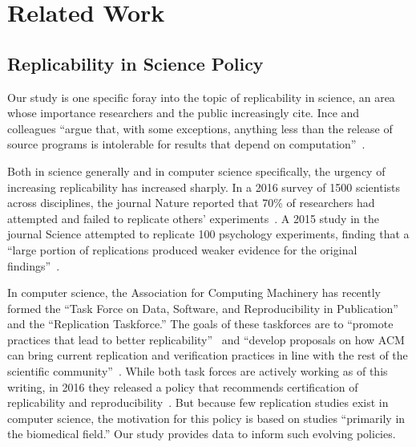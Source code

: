 \documentclass[10pt,conference]{IEEEtran}
\begin{document}
\section{Related Work}


\subsection{Replicability in Science Policy}


Our study is one specific foray into the topic of replicability
in science, an area whose importance researchers and the public 
increasingly cite.
Ince and colleagues ``argue that, with some exceptions, anything less 
than the release of source programs is intolerable for 
results that depend on computation''~\cite{ince2012case}.

Both in science generally and in computer science specifically,
the urgency of increasing replicability has increased sharply.
In a 2016 survey of 1500 scientists across disciplines, the journal
Nature reported that 70\% of researchers had attempted
and failed to replicate others' experiments~\cite{baker20161}.
A 2015 study in the journal Science 
attempted to replicate 100 psychology experiments,
finding that a ``large portion of replications produced weaker evidence for the original findings''~\cite{open2015estimating}.

In computer science, the Association for Computing Machinery has
recently formed the ``Task Force on Data, Software, and Reproducibility in Publication''
and the ``Replication Taskforce.''
The goals of these taskforces are to 
``promote practices that lead to better replicability''~\cite{acmDataTaskforce} and 
``develop proposals on how ACM can bring current replication and 
verification practices in line with the rest of the scientific 
community''~\cite{acmRepTaskforce}.
While both task forces are actively working as of this writing, 
in 2016 they released a policy that recommends certification of
replicability and reproducibility~\cite{acmArtifactPolicy}.
But because few replication studies exist in computer science,
the motivation for this policy is based on studies
``primarily in the biomedical field.''
Our study provides data to inform such evolving policies.
\end{document}
